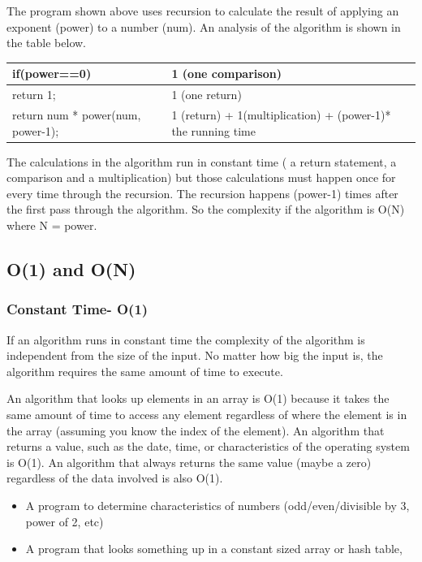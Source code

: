 The program  shown above uses recursion to calculate the result of applying an exponent (power) to a number (num).   
An analysis of the algorithm is shown in the table below.

\begin{tabular}{l|l}
 if(power==0) & 1 (one comparison)\\ \hline
       return 1; &  1 (one return)\\ \hline
       return num * power(num, power-1); & 1 (return) + 1(multiplication) + (power-1)* the running time \\\hline
\end{tabular}

The calculations in the algorithm run in constant time ( a return statement, a comparison and a multiplication)  but those calculations must happen once for every time through the recursion.   The recursion happens (power-1) times after the first pass through the algorithm.   So the complexity if the algorithm is O(N)  where N = power.

\subsection{O(1) and O(N)}

\subsubsection{Constant Time- O(1)}

If an algorithm  runs in constant time the complexity of the algorithm is independent from the size of the
input.  No matter how big the input is, the algorithm requires the same amount of time to execute.

An algorithm that looks up elements in an array is O(1) because it takes
the same amount of time to access any element regardless of where the
element is in the array (assuming you know the index of the element).
An algorithm that returns a value, such as the date, time, or
characteristics of the operating system is O(1). An algorithm that
always returns the same value (maybe a zero) regardless of the data
involved is also O(1).



\begin{itemize}
\item
  A program to determine characteristics of numbers (odd/even/divisible
  by 3, power of 2, etc)
\item
  A program that looks something up in a constant sized array or hash
  table,
\end{itemize}



